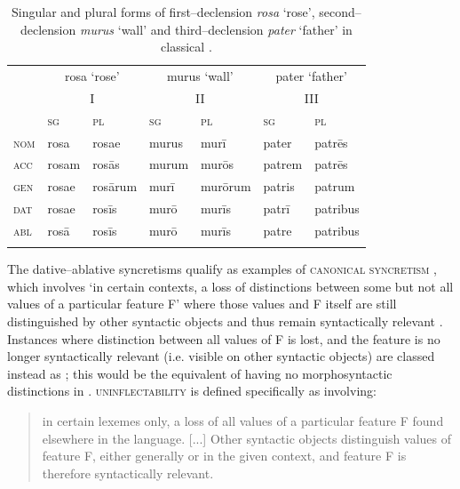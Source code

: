 \documentclass[output=paper,colorlinks,citecolor=brown]{langscibook}
\begin{document}
\begin{table}[ht]
	\centering
	\begin{tabularx}{\textwidth}{lXXXXXX}
		\lsptoprule
			& \multicolumn{2}{c}{rosa ‘rose’} & \multicolumn{2}{c}{murus ‘wall’} & \multicolumn{2}{c}{pater ‘father’} \\
			& \multicolumn{2}{c}{I} & \multicolumn{2}{c}{II} & \multicolumn{2}{c}{III} \\
			\midrule
			& \textsc{sg} & \textsc{pl} & \textsc{sg} & \textsc{pl} & \textsc{sg} & \textsc{pl} \\
			\midrule
			\textsc{nom} & rosa & rosae & murus & murī & pater & patrēs \\
			\textsc{acc} & rosam & rosās & murum & murōs & patrem & patrēs \\
			\textsc{gen} & rosae & rosārum & murī & murōrum & patris & patrum \\
			\textsc{dat} & rosae & rosīs & murō & murīs & patrī & patribus \\
			\textsc{abl} & rosā & rosīs & murō & murīs & patre & patribus \\
		\lspbottomrule
	\end{tabularx}
	\caption{Singular and plural forms of first–declension \emph{rosa} ‘rose’, second–declension \emph{murus} ‘wall’ and third–declension \emph{pater} ‘father’ in classical .}
	\label{06tab1}
\end{table}

The dative--ablative syncretisms qualify as examples of \textsc{canonical syncretism} \citep[34]{baermanbrowncorbett2005}, which involves `in certain contexts, a loss of distinctions between some but not all values of a particular feature F' where those values and F itself are still distinguished by other syntactic objects and thus remain syntactically relevant \citep[34]{baermanbrowncorbett2005}. Instances where distinction between all values of F is lost, and the feature is no longer syntactically relevant (i.e. visible on other syntactic objects) are classed instead as \textsc{} \citep[28--30]{baermanbrowncorbett2005}; this would be the equivalent of having no morphosyntactic  distinctions in . \textsc{uninflectability} is defined specifically as involving:

\begin{quote}
	in certain lexemes only, a loss of all values of a particular feature F found elsewhere in the language. [...] Other syntactic objects distinguish values of feature F, either generally or in the given context, and feature F is therefore syntactically relevant.	
	\hfill \citep[33]{baermanbrowncorbett2005}
\end{quote}
\end{document}
